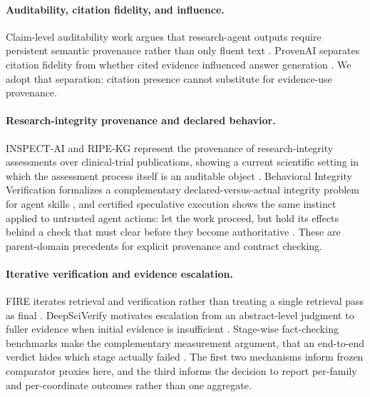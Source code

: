 \paragraph{Auditability, citation fidelity, and influence.}
Claim-level auditability work argues that research-agent outputs require persistent semantic provenance rather than only fluent text \citep{aar2026}. ProvenAI separates citation fidelity from whether cited evidence influenced answer generation \citep{provenai2026}. We adopt that separation: citation presence cannot substitute for evidence-use provenance.

\paragraph{Research-integrity provenance and declared behavior.}
INSPECT-AI and RIPE-KG represent the provenance of research-integrity assessments over clinical-trial publications, showing a current scientific setting in which the assessment process itself is an auditable object \citep{inspectai2026}. Behavioral Integrity Verification formalizes a complementary declared-versus-actual integrity problem for agent skills \citep{behavioralintegrity2026}, and certified speculative execution shows the same instinct applied to untrusted agent actions: let the work proceed, but hold its effects behind a check that must clear before they become authoritative \citep{certifiedspeculative2026}. These are parent-domain precedents for explicit provenance and contract checking.

\paragraph{Iterative verification and evidence escalation.}
FIRE iterates retrieval and verification rather than treating a single retrieval pass as final \citep{fire2024}. DeepSciVerify motivates escalation from an abstract-level judgment to fuller evidence when initial evidence is insufficient \citep{deepsciverify2026}. Stage-wise fact-checking benchmarks make the complementary measurement argument, that an end-to-end verdict hides which stage actually failed \citep{factarena2026}. The first two mechanisms inform frozen comparator proxies here, and the third informs the decision to report per-family and per-coordinate outcomes rather than one aggregate.

